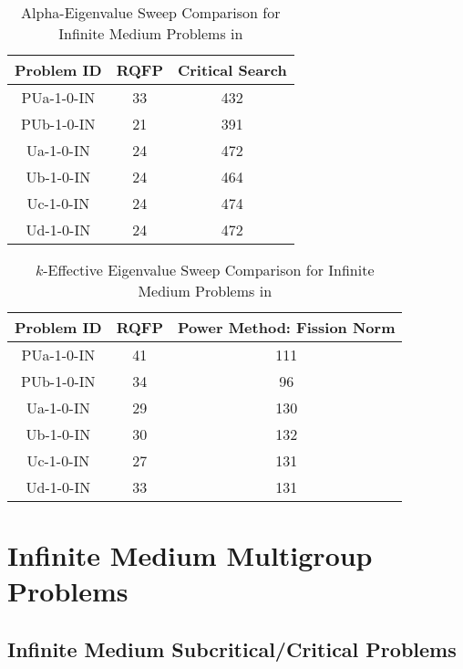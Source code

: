 \begin{table}[t]
    \centering
    \caption{Alpha-Eigenvalue Sweep Comparison for Infinite Medium Problems in \cite{sood2003analytical}}
    \label{table:alph}
    \centering
    \begin{tabular}{*3c}
        Problem ID & RQFP & Critical Search \\    
        \midrule
        PUa-1-0-IN & 33 & 432 \\
        PUb-1-0-IN & 21 & 391   \\
	Ua-1-0-IN & 24 & 472\\
	Ub-1-0-IN & 24 & 464 \\
	Uc-1-0-IN & 24 & 474 \\
	Ud-1-0-IN & 24 & 472\\
        \bottomrule
    \end{tabular}
\end{table}

\begin{table}[t]
    \centering
    \caption{$k$-Effective Eigenvalue Sweep Comparison for Infinite Medium Problems in \cite{sood2003analytical}}
\label{table:k}
    \centering
    \begin{tabular}{*3c}
        Problem ID & RQFP & Power Method: Fission Norm\\    
        \midrule
        PUa-1-0-IN & 41 & 111 \\
        PUb-1-0-IN & 34 & 96   \\
	Ua-1-0-IN & 29 & 130\\
	Ub-1-0-IN & 30 & 132 \\
	Uc-1-0-IN & 27 & 131 \\
	Ud-1-0-IN & 33 & 131\\
        \bottomrule
    \end{tabular}
\end{table}

\clearpage
\section{Infinite Medium Multigroup Problems}

\subsection{Infinite Medium Subcritical/Critical Problems}


